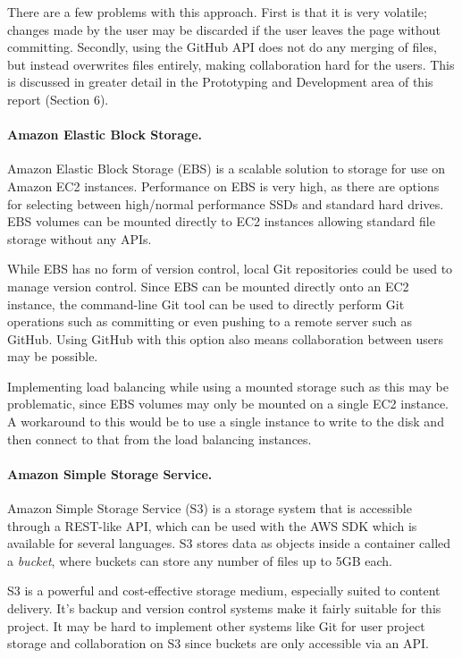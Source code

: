 \documentclass[a4paper, 12pt]{article}
\begin{document}
There are a few problems with this approach. First is that it is very volatile; changes made by the user may be discarded if the user leaves the page without committing. Secondly, using the GitHub API does not do any merging of files, but instead overwrites files entirely, making collaboration hard for the users. This is discussed in greater detail in the Prototyping and Development area of this report (Section 6).

\paragraph{Amazon Elastic Block Storage.}
Amazon Elastic Block Storage (EBS) is a scalable solution to storage for use on Amazon EC2 instances. Performance on EBS is very high, as there are options for selecting between high/normal performance SSDs and standard hard drives. EBS volumes can be mounted directly to EC2 instances allowing standard file storage without any APIs.\cite{awsebs}

While EBS has no form of version control, local Git repositories could be used to manage version control. Since EBS can be mounted directly onto an EC2 instance, the command-line Git tool can be used to directly perform Git operations such as committing or even pushing to a remote server such as GitHub. Using GitHub with this option also means collaboration between users may be possible.

Implementing load balancing while using a mounted storage such as this may be problematic, since EBS volumes may only be mounted on a single EC2 instance. A workaround to this would be to use a single instance to write to the disk and then connect to that from the load balancing instances.

\paragraph{Amazon Simple Storage Service.}
Amazon Simple Storage Service (S3) is a storage system that is accessible through a REST-like API, which can be used with the AWS SDK which is available for several languages.\cite{awss3} S3 stores data as objects inside a container called a \emph{bucket}, where buckets can store any number of files up to 5GB each.

S3 is a powerful and cost-effective storage medium, especially suited to content delivery. It's backup and version control systems make it fairly suitable for this project.\cite{awss3} It may be hard to implement other systems like Git for user project storage and collaboration on S3 since buckets are only accessible via an API.
\end{document}

